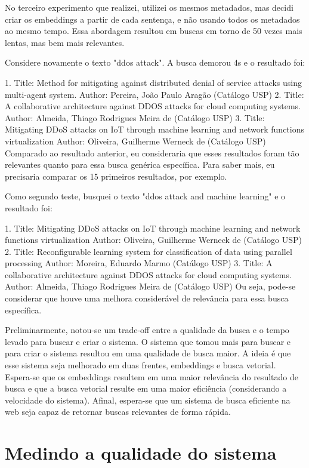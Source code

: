 \documentclass[
	12pt,				%
	openright,			%
	oneside,			%
	a4paper,			%
	english,			%
	french,				%
	spanish,			%
	brazil				%
	]{abntex2}
\begin{document}
No terceiro experimento que realizei, utilizei os mesmos metadados, mas decidi criar os embeddings a partir de cada sentença, e não usando todos os metadados ao mesmo tempo. Essa abordagem resultou em buscas em torno de 50 vezes mais lentas, mas bem mais relevantes.

Considere novamente o texto "ddos attack". A busca demorou 4s e o resultado foi:

1. Title:  Method for mitigating against distributed denial of service attacks using multi-agent system.
Author:  Pereira, João Paulo Aragão (Catálogo USP)
2. Title:  A collaborative architecture against DDOS attacks for cloud computing systems.
Author:  Almeida, Thiago Rodrigues Meira de (Catálogo USP)
3. Title:  Mitigating DDoS attacks on IoT through machine learning and network functions virtualization
Author:  Oliveira, Guilherme Werneck de (Catálogo USP)
Comparado ao resultado anterior, eu consideraria que esses resultados foram tão relevantes quanto para essa busca genérica específica. Para saber mais, eu precisaria comparar os 15 primeiros resultados, por exemplo.

Como segundo teste, busquei o texto "ddos attack and machine learning" e o resultado foi:

1. Title:  Mitigating DDoS attacks on IoT through machine learning and network functions virtualization
Author:  Oliveira, Guilherme Werneck de (Catálogo USP)
2. Title:  Reconfigurable learning system for classification of data using parallel processing
Author:  Moreira, Eduardo Marmo (Catálogo USP)
3. Title:  A collaborative architecture against DDOS attacks for cloud computing systems.
Author:  Almeida, Thiago Rodrigues Meira de (Catálogo USP)
Ou seja, pode-se considerar que houve uma melhora considerável de relevância para essa busca específica.

Preliminarmente, notou-se um trade-off entre a qualidade da busca e o tempo levado para buscar e criar o sistema. O sistema que tomou mais para buscar e para criar o sistema resultou em uma qualidade de busca maior. A ideia é que esse sistema seja melhorado em duas frentes, embeddings e busca vetorial. Espera-se que os embeddings resultem em uma maior relevância do resultado de busca e que a busca vetorial resulte em uma maior eficiência (considerando a velocidade do sistema). Afinal, espera-se que um sistema de busca eficiente na web seja capaz de retornar buscas relevantes de forma rápida.



\section{Medindo a qualidade do sistema}
\end{document}
